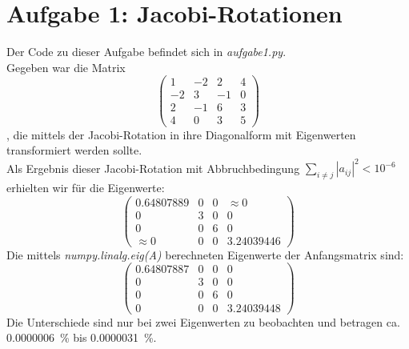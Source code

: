 \newpage
\section{Aufgabe 1: Jacobi-Rotationen}
\label{sec:auf1}

Der Code zu dieser Aufgabe befindet sich in \textit{aufgabe1.py}.
\newline\\
Gegeben war die Matrix
\[
\begin{pmatrix}
    1 & -2 & 2 & 4\\
    -2 & 3 & -1 & 0\\
    2 & -1 & 6 & 3\\
    4 & 0 & 3 & 5
\end{pmatrix}
\]
, die mittels der Jacobi-Rotation in ihre Diagonalform mit Eigenwerten transformiert werden sollte.\\
Als Ergebnis dieser Jacobi-Rotation mit Abbruchbedingung $\sum_{i\neq j}|a_{ij}|^2 < 10^{-6}$ erhielten wir für die Eigenwerte:
\[
\begin{pmatrix}
    0.64807889 & 0 & 0 & \approx0\\
    0 & 3 & 0 & 0\\
    0 & 0 & 6 & 0\\
    \approx0 & 0 & 0 & 3.24039446
\end{pmatrix}
\]
Die mittels \textit{numpy.linalg.eig(A)} berechneten Eigenwerte der Anfangsmatrix sind:
\[
\begin{pmatrix}
    0.64807887 & 0 & 0 & 0\\
    0 & 3 & 0 & 0\\
    0 & 0 & 6 & 0\\
    0 & 0 & 0 & 3.24039448
\end{pmatrix}
\]
Die Unterschiede sind nur bei zwei Eigenwerten zu beobachten und betragen ca. \SI{0.0000006}{\percent} bis \SI{0.0000031}{\percent}.